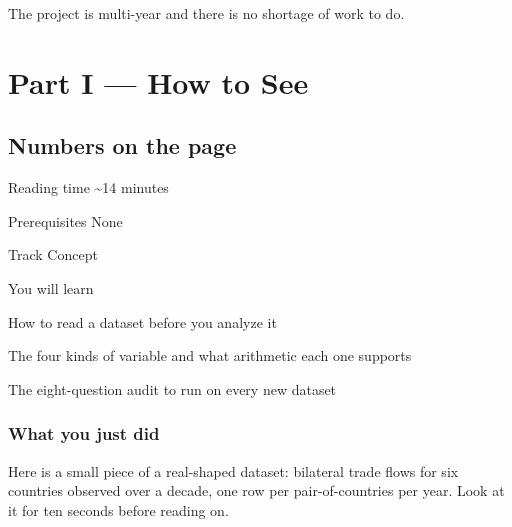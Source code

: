 \documentclass[
  letterpaper,
  11pt,
  twoside,
  openany]{scrbook}
\begin{document}
The project is multi-year and there is no shortage of work to do.

\part{Part I --- How to See}

\chapter{Numbers on the page}\label{numbers-on-the-page}

{Reading time} {\textasciitilde14 minutes}

{Prerequisites} {None}

{Track} {Concept}

{You will learn}

How to read a dataset before you analyze it

The four kinds of variable and what arithmetic each one supports

The eight-question audit to run on every new dataset

\section{What you just did}\label{what-you-just-did}

Here is a small piece of a real-shaped dataset: bilateral trade flows
for six countries observed over a decade, one row per pair-of-countries
per year. Look at it for ten seconds before reading on.
\end{document}
